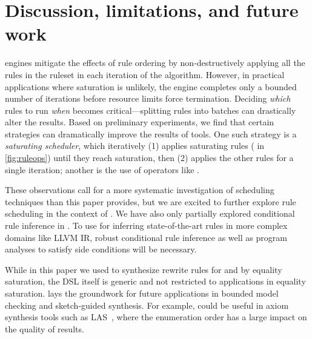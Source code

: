 \section{Discussion, limitations, and future work}
\label{sec:lim}

\Eqsat engines mitigate the effects of
  rule ordering by non-destructively
  applying all the rules in the ruleset
  in each iteration of the algorithm.
However, in practical applications
  where saturation is unlikely,
  the engine completes only a bounded number of iterations
  before resource limits force termination.
Deciding \textit{which}
  rules to run \textit{when}
  becomes critical---splitting
  rules into batches can
  drastically alter the results.
Based on preliminary experiments,
  we find that certain strategies
  can dramatically improve the results of \eqsat tools.
One such strategy is a
  \textit{saturating scheduler}, which
  iteratively
  (1) applies saturating rules
  ( in \autoref{fig:ruleops})
  until they reach saturation, then (2) applies
  the other rules for a single
  iteration; another is the use of
  operators like .

These observations call for a
  more systematic investigation
  of scheduling techniques than this paper provides, but we
  are excited to further explore
  rule scheduling in the context of \eqsat.
We have also only partially explored conditional rule inference in \enumo.
To use \enumo for inferring state-of-the-art
 rules in more complex domains like LLVM IR,
robust conditional rule inference as well as
program analyses to satisfy side conditions will be necessary.

While in this paper we used \enumo to synthesize rewrite
rules for and by equality saturation, the DSL itself is
generic and not restricted to applications in equality saturation.
\enumo lays the groundwork for future applications in
bounded model checking and sketch-guided synthesis.
For example, \enumo could be useful in axiom synthesis tools such as
  LAS~\citep{oopsla22-logic}, where the enumeration order has a large impact on the
  quality of results.

